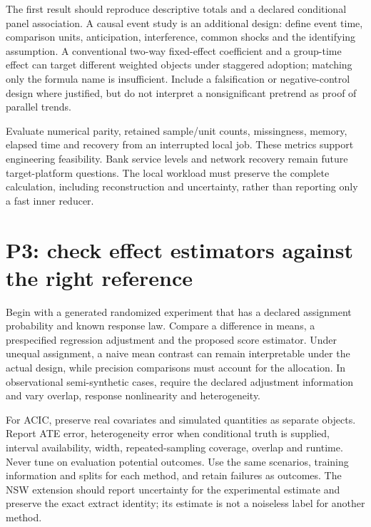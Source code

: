 The first result should reproduce descriptive totals and a declared
conditional panel association. A causal event study is an additional
design: define event time, comparison units, anticipation, interference,
common shocks and the identifying assumption. A conventional two-way
fixed-effect coefficient and a group-time effect can target different
weighted objects under staggered adoption; matching only the formula
name is insufficient. Include a falsification or negative-control design
where justified, but do not interpret a nonsignificant pretrend as proof
of parallel trends.

Evaluate numerical parity, retained sample/unit counts, missingness,
memory, elapsed time and recovery from an interrupted local job. These
metrics support engineering feasibility. Bank service levels and network
recovery remain future target-platform questions. The local workload
must preserve the complete calculation, including reconstruction and
uncertainty, rather than reporting only a fast inner reducer.

\hypertarget{p3-check-effect-estimators-against-the-right-reference}{%
\section{P3: check effect estimators against the right
reference}\label{p3-check-effect-estimators-against-the-right-reference}}

Begin with a generated randomized experiment that has a declared
assignment probability and known response law. Compare a difference in
means, a prespecified regression adjustment and the proposed score
estimator. Under unequal assignment, a naive mean contrast can remain
interpretable under the actual design, while precision comparisons must
account for the allocation. In observational semi-synthetic cases,
require the declared adjustment information and vary overlap, response
nonlinearity and heterogeneity.

For ACIC, preserve real covariates and simulated quantities as separate
objects. Report ATE error, heterogeneity error when conditional truth is
supplied, interval availability, width, repeated-sampling coverage,
overlap and runtime. Never tune on evaluation potential outcomes. Use
the same scenarios, training information and splits for each method, and
retain failures as outcomes. The NSW extension should report uncertainty
for the experimental estimate and preserve the exact extract identity;
its estimate is not a noiseless label for another method.

